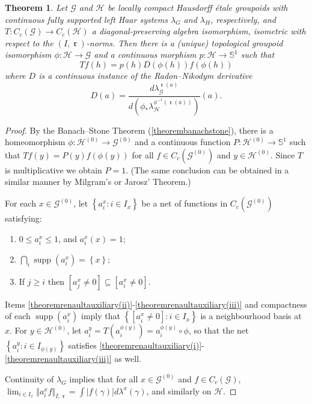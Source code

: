 \documentclass[letter,11pt]{amsart}
\theoremstyle{plain}		\newtheorem{theorem}[generalnumbering]{Theorem}
\theoremstyle{plain}		\newtheorem{corollary}[generalnumbering]{Corollary}
\theoremstyle{definition}		\newtheorem{definition}[generalnumbering]{Definition}
\theoremstyle{definition}		\newtheorem{example}[generalnumbering]{Example}
\theoremstyle{plain}		\newtheorem{proposition}[generalnumbering]{Proposition}
\theoremstyle{plain}		\newtheorem{lemma}[generalnumbering]{Lemma}
\theoremstyle{plain}    \newtheorem{plainstyle}[generalnumbering]{\namefordifferentenvironment}
\theoremstyle{plain}    \newtheorem*{plainstyle*}{\namefordifferentenvironment}
\theoremstyle{definition}    \newtheorem{definitionstyle}[generalnumbering]{\namefordifferentenvironment}
\theoremstyle{definition}    \newtheorem*{definitionstyle*}{\namefordifferentenvironment}
\DeclareMathOperator{\supp}{supp}
\DeclareMathOperator{\ra}{\mathfrak{r}}
\begin{document}
\begin{theorem}\label{theoremrenault}
	Let $\mathcal{G}$ and $\mathcal{H}$ be locally compact Hausdorff étale groupoids with continuous fully supported left Haar systems $\lambda_G$ and $\lambda_H$, respectively, and $T\colon C_c(\mathcal{G})\to C_c(\mathcal{H})$ a diagonal-preserving algebra isomorphism, isometric with respect to the $(I,\ra)$-norms. Then there is a (unique) topological groupoid isomorphism $\phi\colon\mathcal{H}\to\mathcal{G}$ and a continuous morphism $p\colon\mathcal{H}\to\mathbb{S}^1$ such that
	\[Tf(h)=p(h)D(\phi(h))f(\phi(h))\]
	where $D$ is a continuous instance of the Radon--Nikodym derivative
	\[D(a)=\frac{d\lambda_{\mathcal{G}}^{\ra(a)}}{d(\phi_*\lambda_{\mathcal{H}}^{\phi^{-1}(\ra(a))})}(a).\]
\end{theorem}
\begin{proof}
	By the Banach--Stone Theorem (\ref{theorembanachstone}), there is a homeomorphism $\phi\colon\mathcal{H}^{(0)}\to\mathcal{G}^{(0)}$ and a continuous function $P\colon\mathcal{H}^{(0)}\to\mathbb{S}^1$ such that $Tf(y)=P(y)f(\phi(y))$ for all $f\in C_c(\mathcal{G}^{(0)})$ and $y\in\mathcal{H}^{(0)}$. Since $T$ is multiplicative we obtain $P=1$. (The same conclusion can be obtained in a similar manner by Milgram's or Jarosz' Theorem.)
	
	For each $x\in\mathcal{G}^{(0)}$, let $\left\{a^x_i:i\in I_x\right\}$ be a net of functions in $C_c(\mathcal{G}^{(0)})$ satisfying:
	\begin{enumerate}[label=(\roman*)]
		\item\label{theoremrenaultauxiliary(i)} $0\leq a^x_i\leq 1$, and $a^x_i(x)=1$;
		\item\label{theoremrenaultauxiliary(ii)} $\bigcap_i\supp(a^x_i)=\left\{x\right\}$;
		\item\label{theoremrenaultauxiliary(iii)} If $j\geq i$ then $[a^x_j\neq 0]\subseteq[a^x_i\neq 0]$.
	\end{enumerate}
	Items \ref{theoremrenaultauxiliary(ii)}-\ref{theoremrenaultauxiliary(iii)} and compactness of each $\supp(a^x_i)$ imply that $\left\{[a^x_i\neq 0]:i\in I_x\right\}$ is a neighbourhood basis at $x$. For $y\in\mathcal{H}^{(0)}$, let $a^y_i=T(a^{\phi(y)}_i)=a^{\phi(y)}_i\circ\phi$, so that the net $\left\{a^y_i:i\in I_{\phi(y)}\right\}$ satisfies \ref{theoremrenaultauxiliary(i)}-\ref{theoremrenaultauxiliary(iii)} as well.
	
	Continuity of $\lambda_G$ implies that for all $x\in \mathcal{G}^{(0)}$ and $f\in C_c(\mathcal{G})$, $\lim_{i\in I_x}\Vert a^x_i f\Vert_{I,\ra}=\int |f(\gamma)|d\lambda^x(\gamma)$, and similarly on $\mathcal{H}$.
	

\end{proof}
\end{document}

